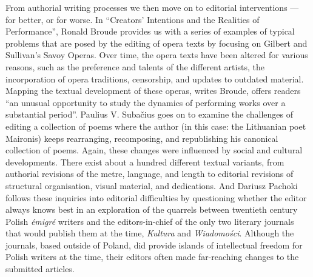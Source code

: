 \begin{preface}
From authorial writing processes we then move on to editorial interventions --- for better, or for worse. 
In ``Creators' Intentions and the Realities of Performance'', Ronald Broude provides us with a series of examples of typical problems that are posed by the editing of opera texts by focusing on Gilbert and Sullivan's Savoy Operas. Over time, the opera texts have been altered for various reasons, such as the preference and talents of the different artists, the incorporation of opera traditions, censorship, and updates to outdated material. Mapping the textual development of these operas, writes Broude, offers readers ``an unusual opportunity to study the dynamics of performing works over a substantial period''. 
Paulius V. Subačius goes on to examine the  challenges of editing a collection of poems where the author (in this case: the Lithuanian poet Maironis) keeps rearranging, recomposing, and republishing his canonical collection of poems. Again, these changes were influenced by social and cultural developments. There exist about a hundred different textual variants, from authorial revisions of the metre, language, and length to editorial revisions of structural organisation, visual material, and dedications.
And Dariusz Pachoki follows these inquiries into editorial difficulties by questioning whether the editor always knows best in an exploration of the quarrels between twentieth century Polish \emph{émigré} writers and the editors-in-chief of the only two literary journals that would publish them at the time, \emph{Kultura} and \emph{Wiadomości}. Although the journals, based outside of Poland, did provide islands of intellectual freedom for Polish writers at the time, their editors often made far-reaching changes to the submitted articles. 


\end{preface}
